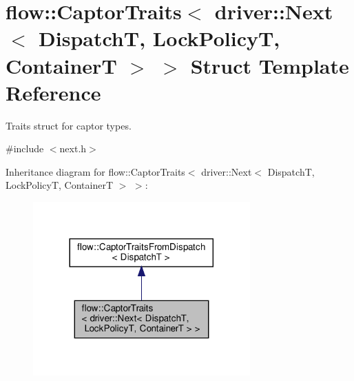 \hypertarget{structflow_1_1_captor_traits_3_01driver_1_1_next_3_01_dispatch_t_00_01_lock_policy_t_00_01_container_t_01_4_01_4}{}\section{flow\+:\+:Captor\+Traits$<$ driver\+:\+:Next$<$ DispatchT, Lock\+PolicyT, ContainerT $>$ $>$ Struct Template Reference}
\label{structflow_1_1_captor_traits_3_01driver_1_1_next_3_01_dispatch_t_00_01_lock_policy_t_00_01_container_t_01_4_01_4}


Traits struct for captor types.  




{\ttfamily \#include $<$next.\+h$>$}



Inheritance diagram for flow\+:\+:Captor\+Traits$<$ driver\+:\+:Next$<$ DispatchT, Lock\+PolicyT, ContainerT $>$ $>$\+:\nopagebreak
\begin{figure}[H]
\begin{center}
\leavevmode
\includegraphics[width=236pt]{structflow_1_1_captor_traits_3_01driver_1_1_next_3_01_dispatch_t_00_01_lock_policy_t_00_01_conta17f27d6e99a8591c024bc9b6e5353043}
\end{center}
\end{figure}


